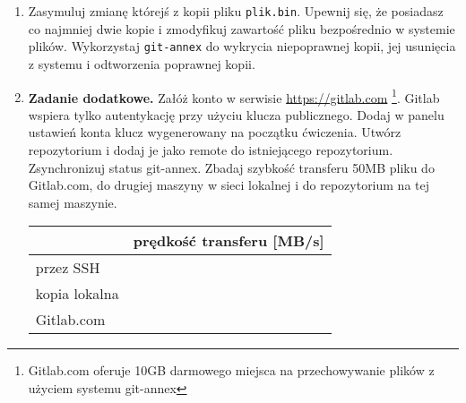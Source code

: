 \documentclass[polish]{article}
\newif\ifteacher
\begin{document}
\begin{enumerate}
    \item
    Zasymuluj zmianę którejś z kopii pliku \texttt{plik.bin}.
    Upewnij się, że posiadasz co najmniej dwie kopie i zmodyfikuj zawartość
    pliku bezpośrednio w systemie plików.
    Wykorzystaj \texttt{git-annex} do wykrycia niepoprawnej kopii, jej
    usunięcia z systemu i odtworzenia poprawnej kopii.

\ifteacher
    \begin{lstlisting}
hostB-main.git$ git annex fsck --from hostB-backup plik.bin
fsck plik.bin Bad file size (7 B larger); dropped from hostB-backup

Only 1 of 2 trustworthy copies exist of plik.bin
Back it up with git-annex copy.
failed
(Recording state in git...)
git-annex: fsck: 1 failed

hostB-main.git$ git annex get --auto plik.bin
get plik.bin (from hostA-main...) SHA256-s512000000--4c98cf638799a07eb85872e7f5f5d8d661c09e6e15af02f3655ed9250cae13b0
512000000 100\% 45.54MB/s 0:00:10 (xfer#1, to-check=0/1)

sent 30 bytes received 512062649 bytes 44527189.48 bytes/sec
total size is 512000000 speedup is 1.00
ok
(Recording state in git...)
    \end{lstlisting}
\fi

    \item
    \textbf{Zadanie dodatkowe.} Załóż konto w serwisie
    \href{https://gitlab.com}{https://gitlab.com}
    \footnote{Gitlab.com oferuje 10GB darmowego miejsca na przechowywanie
    plików z użyciem systemu git-annex}.
    Gitlab wspiera tylko autentykację przy użyciu klucza publicznego. Dodaj
    w panelu ustawień konta klucz wygenerowany na początku ćwiczenia.
    Utwórz repozytorium i dodaj je jako remote do istniejącego repozytorium.
    Zsynchronizuj status git-annex. Zbadaj szybkość transferu 50MB pliku do
    Gitlab.com, do drugiej maszyny w sieci lokalnej i do repozytorium na tej
    samej maszynie.

    \begin{tabular}{|l|p{}|}
    \hline
    & prędkość transferu [MB/s] \\
    \hline
    przez SSH & \\
    \hline
    kopia lokalna & \\
    \hline
    Gitlab.com & \\
    \hline
    \end{tabular}

\end{enumerate}
\end{document}
